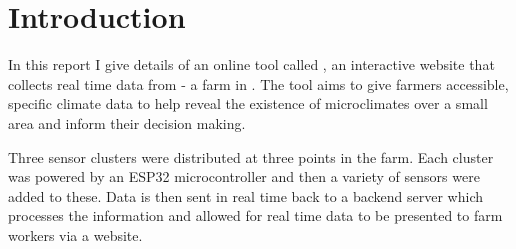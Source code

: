\section{Introduction}

In this report I give details of an online tool called \myReportTitle, an
interactive website that collects real time data from \farmName - a farm in
\farmLocation. The tool aims to give farmers accessible, specific climate data
to help reveal the existence of microclimates over a small area and inform their
decision making.

Three sensor clusters were distributed at three points in the farm. Each
cluster was powered by an ESP32 microcontroller and then a variety of sensors
were added to these. Data is then sent in real time back to a backend server
which processes the information and allowed for real time data to be presented
to farm workers via a website.

